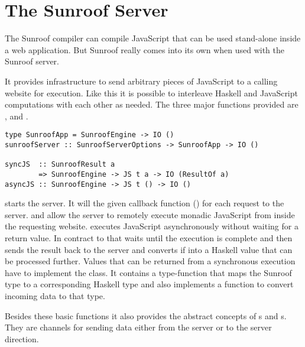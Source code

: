  
\section{The Sunroof Server}
\label{sec:server}

The Sunroof compiler can compile JavaScript that can be used
stand-alone inside a web application. But Sunroof really comes
into its own when used with the Sunroof server.

It provides infrastructure to send arbitrary pieces 
of JavaScript to a calling website for execution. 
Like this it is possible to interleave Haskell and JavaScript 
computations with each other as needed. The three major functions
provided are ,  and .
\begin{verbatim}
type SunroofApp = SunroofEngine -> IO ()
sunroofServer :: SunroofServerOptions -> SunroofApp -> IO ()

syncJS  :: SunroofResult a 
        => SunroofEngine -> JS t a -> IO (ResultOf a)
asyncJS :: SunroofEngine -> JS t () -> IO ()
\end{verbatim}
 starts the server.
It will the given callback function () 
for each request to the server.
 and  allow the server
to remotely execute monadic JavaScript from inside the 
requesting website.
 executes JavaScript asynchronously without 
waiting for a return value. In contract to that 
 waits until the execution is complete and
then sends the result back to the server and converts if 
into a Haskell value that can be processed further. 
Values that can be returned from a synchronous execution 
have to implement the  class. It contains a type-function
 that maps the 
Sunroof type to a corresponding Haskell type and also 
implements a function to convert incoming data to that 
type.

Besides these basic functions it also provides the abstract 
concepts of s and s. They are 
channels for sending data either from the server or to
the server direction.

